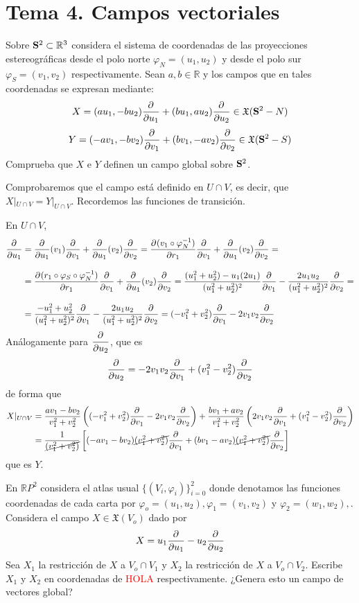 \section{Tema 4. Campos vectoriales}
\begin{ejer}
    [4.2] Sobre $\bold S^2 \subset \mathbb R^3$ considera el sistema de coordenadas de las proyecciones estereogr\' aficas desde el polo norte $\varphi_N = (u_1, u_2)$ y desde el polo sur $\varphi_S = (v_1, v_2)$ respectivamente. Sean $a, b \in \mathbb R$ y los campos que en tales coordenadas se expresan mediante:
    $$X = (au_1,-bu_2) \dfrac{\partial^{} }{\partial u_1} + (bu_1,au_2) \dfrac{\partial^{} }{\partial u_2} \in\mathfrak X(\bold S^2 -N)$$
    $$Y = (-av_1,-bv_2) \dfrac{\partial^{} }{\partial v_1} + (bv_1,-av_2) \dfrac{\partial^{} }{\partial v_2} \in\mathfrak X(\bold S^2 -S)$$
    Comprueba que $X$ e $Y$ definen un campo global sobre $\bold S^2$.
\end{ejer}
\begin{sol}
    Comprobaremos que el campo est\'a definido en $U \cap V$, es decir, que $X|_{U \cap V} = Y|_{U\cap V}$. Recordemos las funciones de transici\'on. 

    En $U \cap V$, 
    \[ \begin{split} \dfrac{\partial^{} }{\partial u_1}& = \dfrac{\partial^{} }{\partial u_1}(v_1) \dfrac{\partial^{} }{\partial v_1} + \dfrac{\partial^{} }{\partial u_1}(v_2) \dfrac{\partial^{} }{\partial v_2} =  \dfrac{\partial^{} (v_1\circ \varphi^{-1}_N)}{\partial r_1} \dfrac{\partial^{} }{\partial v_1} + \dfrac{\partial^{} }{\partial u_1}(v_2) \dfrac{\partial^{} }{\partial v_2}= \\[3mm] & = \dfrac{\partial^{} (r_1\circ \varphi_S \circ \varphi^{-1}_N)}{\partial r_1} \dfrac{\partial^{} }{\partial v_1} + \dfrac{\partial^{} }{\partial u_1}(v_2) \dfrac{\partial^{} }{\partial v_2} = \dfrac{(u_1^2+u_2^2)-u_1(2u_1)}{(u_1^2+u_2^2)^2} \dfrac{\partial^{} }{\partial v_1} - \dfrac{2u_1u_2}{(u_1^2+u_2^2)^2} \dfrac{\partial^{} }{\partial v_2} = \\[3mm] & = \dfrac{-u_1^2+u_2^2}{(u_1^2+u_2^2)^2} \dfrac{\partial^{} }{\partial v_1} - \dfrac{2u_1u_2}{(u_1^2+u_2^2)^2} \dfrac{\partial^{} }{\partial v_2} = (-v_1^2 + v_2^2) \dfrac{\partial^{} }{\partial v_1} - 2v_1 v_2 \dfrac{\partial^{} }{\partial v_2}    \end{split} \]
    An\'alogamente para $\dfrac{\partial^{} }{\partial u_2}$, que es 
    $$\dfrac{\partial^{} }{\partial u_2} = -2v_1v_2 \dfrac{\partial^{} }{\partial v_1} + (v_1^2- v_2^2) \dfrac{\partial^{} }{\partial v_2}$$
    de forma que 
    \[ \begin{split}X|_{U\cap V} & = \dfrac{av_1-bv_2}{v_1^2+v_2^2} \left( (-v_1^2+v_2^2) \dfrac{\partial^{} }{\partial v_1} - 2v_1v_2 \dfrac{\partial^{} }{\partial v_2}\right) + \dfrac{bv_1+av_2}{v_1^2+v_2^2} \left(2v_1v_2 \dfrac{\partial^{} }{\partial v_1} + (v_1^2- v_2^2) \dfrac{\partial^{} }{\partial v_2} \right) \\
    & = \dfrac{1}{\cancel{(v_1^2+v_2^2)}} \left[ (-av_1-bv_2)\cancel{(v_1^2+v_2^2)} \dfrac{\partial^{} }{\partial v_1} + (bv_1-av_2) \cancel{(v_1^2+v_2^2)} \dfrac{\partial^{} }{\partial v_2}   \right]
    \end{split}\]
    que es $Y$.
\end{sol}
\begin{ejer}
    [4.5] En $\mathbb RP^2$ considera el atlas usual $\{(V_i, \varphi_i)\}_{i=0}^2$ donde denotamos las funciones coordenadas de cada carta por $\varphi_o = (u_1, u_2), \varphi_1 = (v_1, v_2)$ y $\varphi_2 = (w_1, w_2),$. Considera el campo $X \in \mathfrak X(V_o)$ dado por $$X=u_1 \dfrac{\partial^{} }{\partial u_1}-u_2\dfrac{\partial^{} }{\partial u_2}$$
    Sea $X_1$ la restricci\'on de $X$ a $V_o \cap V_1$
y $X_2$ la restricci\'on de $X$ a $V_o \cap V_2$. Escribe $X_1$ y $X_2$ en coordenadas de \textcolor{red}{HOLA} respectivamente. ¿Genera esto un campo de vectores global? 
\end{ejer}
